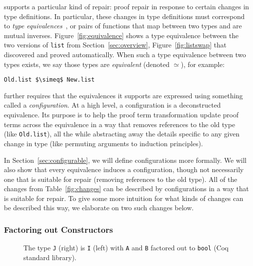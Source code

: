 \toolname supports a particular kind of repair: proof repair in response to certain changes in type definitions.
In particular, these changes in type definitions must correspond to \textit{type equivalences}~\cite{univalent2013homotopy},
or pairs of functions that map between two types and are mutual inverses.
Figure~\ref{fig:equivalence} shows a type equivalence between the two versions of \lstinline{list}
from Section~\ref{sec:overview}, Figure~\ref{fig:listswap} that \toolname discovered and proved automatically.
When such a type equivalence between two types exists, we say those types are \textit{equivalent} (denoted $\simeq$), for example:

\begin{lstlisting}
Old.list $\simeq$ New.list
\end{lstlisting}

\toolname further requires that the equivalences it supports are expressed using something called a \textit{configuration}.
At a high level, a configuration is a deconstructed equivalence.
Its purpose is to help the proof term transformation update proof terms across the equivalence in a way that removes
references to the old type (like \lstinline{Old.list}), all the while abstracting away the details specific to any given change in type
(like permuting arguments to induction principles).

In Section~\ref{sec:configurable}, we will define configurations more formally.
We will also show that every equivalence induces a configuration, %
though not necessarily one that is suitable for repair (removing references to the old type).
All of the changes from Table~\ref{fig:changes} can be described by configurations in a way that is suitable for repair.
To give some more intuition for what kinds of changes can be described this way, we elaborate on two such changes below.

\subsubsection{Factoring out Constructors}
\label{sec:ex1}

\begin{figure}
\begin{minipage}{0.48\columnwidth}

\end{minipage}
\hfill
\begin{minipage}{0.48\columnwidth}

\end{minipage}
\vspace{-0.3cm}
\caption{The type \lstinline{J} (right) is \lstinline{I} (left) with \lstinline{A} and \lstinline{B} factored out to \lstinline{bool} (Coq standard library).}
\label{fig:equivalence2}
\end{figure}

